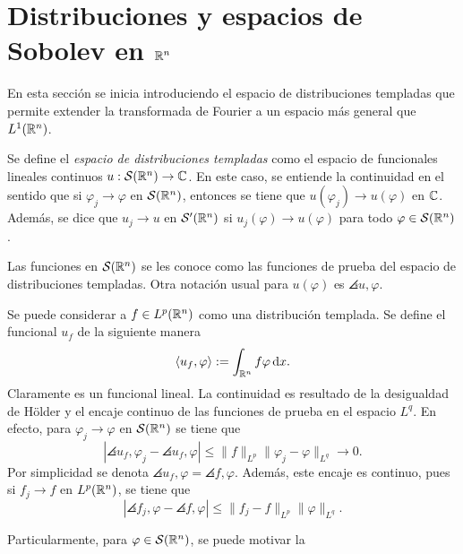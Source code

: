 \section{Distribuciones y espacios de Sobolev en $\mathbb{R}^n$}
En esta sección se inicia introduciendo el espacio de distribuciones templadas
que permite extender la transformada de Fourier a un espacio más general 
que $L^1(\mathbb{R}^n)$.
\begin{definition}
    Se define el \textit{espacio de distribuciones templadas} como 
    el espacio de funcionales lineales continuos 
    $u:\mathcal{S}(\mathbb{R}^n)\to\mathbb{C}$. 
    En este caso, se entiende la continuidad en el sentido que si 
    $\varphi_j\rightarrow\varphi$ en $\mathcal{S}(\mathbb{R}^n)$, entonces se tiene
    que $u(\varphi_j) \rightarrow u(\varphi)$ en $\mathbb{C}$. Además, se dice que 
    $u_j\rightarrow u$ en $\mathcal{S}'(\mathbb{R}^n)$ si 
    $u_j(\varphi)\rightarrow u(\varphi)$ para todo $\varphi\in \mathcal{S}(\mathbb{R}^n)$.
\end{definition}
Las funciones en $\mathcal{S}(\mathbb{R}^n)$ se les conoce como las funciones de prueba
del espacio de distribuciones templadas. Otra notación usual para $u(\varphi)$
es $\angles{u,\varphi}$.
\begin{remark}
    Se puede considerar a $f\in L^p(\mathbb{R}^n)$ como una distribución templada. Se 
    define el funcional $u_f$ de la siguiente manera
    \begin{equation*}
        \langle u_f, \varphi\rangle := \int_{\mathbb{R}^n} f\varphi \mathop{}\!\mathrm{d} x.
    \end{equation*}
    Claramente es un funcional lineal. La continuidad es resultado de la
    desigualdad de H\"older y el encaje continuo de las funciones de prueba
    en el espacio $L^q$. En efecto, para $\varphi_j\rightarrow\varphi$ en 
    $\mathcal{S}(\mathbb{R}^n)$ se tiene que
    \begin{equation*}
        |\angles{u_f, \varphi_j} - \angles{u_f, \varphi}| \leq 
        \|f\|_{L^p}\|\varphi_j - \varphi\|_{L^q} \rightarrow 0.
    \end{equation*}
    Por simplicidad se denota $\angles{u_f, \varphi} = \angles{f, \varphi}$. Además, este encaje es continuo, pues si $f_j\rightarrow f$ en $L^p(\mathbb{R}^n)$, se tiene que 
    \begin{equation*}
    	|\angles{f_j, \varphi} - \angles{f, \varphi}| \leq \|f_j-f\|_{L^p}\|\varphi\|_{L^q}.
    \end{equation*}
\end{remark}
Particularmente, para $\varphi\in\mathcal{S}(\mathbb{R}^n)$, se puede motivar la 
